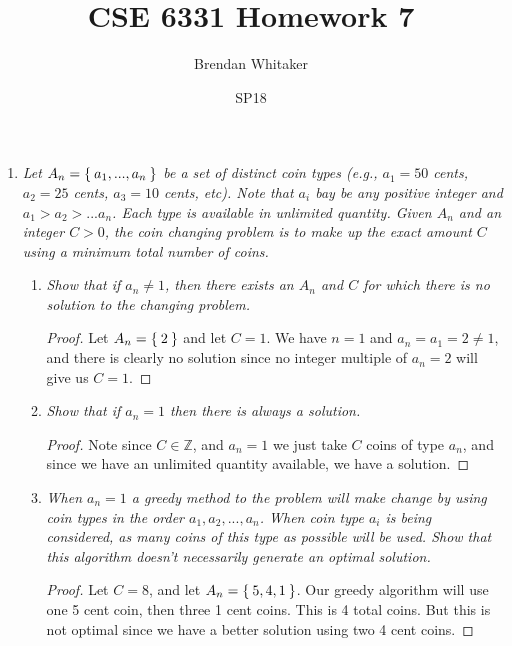 \documentclass[12pt,oneside,reqno]{amsart}
\theoremstyle{plain}
\theoremstyle{definition}
\theoremstyle{remark}
\newcommand{\z}{\mathbb{Z}}
\newcommand{\bb}{\vspace{3mm}}
\begin{document}
\title{CSE 6331 Homework 7}

\date{SP18}

\author[Brendan Whitaker]{Brendan Whitaker}

\maketitle



\begin{enumerate}[label=\arabic*.]

\item \textit{Let $A_n = \Set{a_1,...,a_n}$ be a set of distinct coin types (e.g., $a_1 = 50$ cents, $a_2 = 25$ cents, $a_3 = 10$ cents, etc). Note that $a_i$ bay be any positive integer and $a_1 > a_2 > ... a_n$. Each type is available in unlimited quantity. Given $A_n$ and an integer $C> 0$, the coin changing problem is to make up the exact amount $C$ using a minimum total number of coins. }
\bb

\begin{enumerate}
\item \textit{Show that if $a_n \neq 1$, then there exists an $A_n$ and $C$ for which there is no solution to the changing problem. }

\begin{proof}
Let $A_n = \Set{2}$ and let $C = 1$. We have $n = 1$ and $a_n = a_1 = 2 \neq 1$, and there is clearly no solution since no integer multiple of $a_n = 2$ will give us $C = 1$. 
\end{proof}

\bb
\item \textit{Show that if $a_n  = 1$ then there is always a solution. }

\begin{proof}
Note since $C \in \z$, and $a_n = 1$ we just take $C$ coins of type $a_n$, and since we have an unlimited quantity available, we have a solution. 
\end{proof}
\bb

\item \textit{When $a_n = 1$ a greedy method to the problem will make change by using coin types in the order $a_1,a_2,...,a_n$. When coin type $a_i$ is being considered, as many coins of this type as possible will be used. Show that this algorithm doesn't necessarily generate an optimal solution. }

\begin{proof}
Let $C = 8$, and let $A_n = \Set{5,4,1}$. Our greedy algorithm will use one 5 cent coin, then three 1 cent coins. This is 4 total coins. But this is not optimal since we have a better solution using two 4 cent coins. 
\end{proof}


\end{enumerate}
\end{enumerate}
\end{document}
